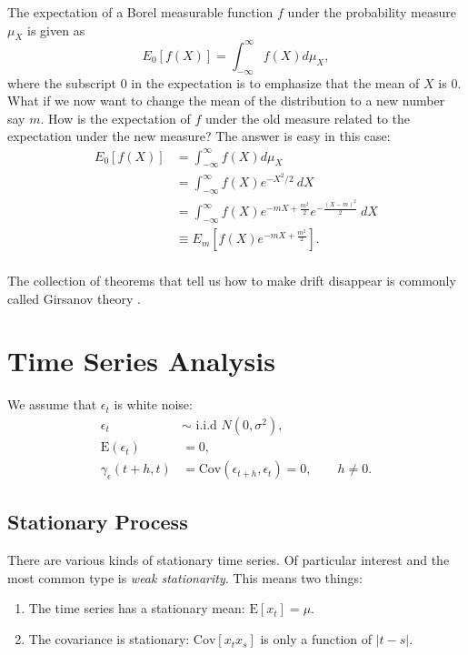 \documentclass{amsart}
\theoremstyle{plain}
\numberwithin{equation}{section}
\begin{document}
The expectation of a Borel measurable function 
$f$ under the probability measure 
$\mu_X$ is given as
\begin{equation*}
E_0[f(X)] = \int_{-\infty}^{\infty} f(X) d\mu_X,
\end{equation*}
where the subscript $0$ in the expectation is to 
emphasize that the mean of $X$ is $0$. What if
we now want to change the mean of the distribution
to a new number say $m$. How is the expectation of
$f$ under the old measure related to the 
expectation under the new measure?
The answer is easy in this case:
\begin{align*}
E_0[f(X)] &= \int_{-\infty}^{\infty} f(X) d\mu_X \\
					&= \int_{-\infty}^{\infty} f(X) e^{-X^2/2} \: dX \\
					&= \int_{-\infty}^{\infty} f(X) e^{-mX + \frac{m^2}{2}}e^{-\frac{(X-m)^2}{2}} \: dX \\
					&\equiv E_m\left[f(X)e^{-mX + \frac{m^2}{2}}\right].\\
\end{align*}


The collection of theorems that tell us how to make 
drift disappear is commonly called Girsanov theory
\cite[Ch.\ 13]{steele2001stochastic}.

\section{Time Series Analysis}
We assume that $\epsilon_t$ is white noise:
\begin{align*}
\epsilon_t &\sim \textrm{ i.i.d } N(0, \sigma^2),\\
\mathrm{E}(\epsilon_t) &= 0,\\
\gamma_\epsilon(t+h, t) &= \mathrm{Cov}(\epsilon_{t+h}, \epsilon_t) = 0, \qquad h \neq 0.
\end{align*}

\subsection*{Stationary Process}
There are various kinds of stationary time series. Of 
particular interest and the most common type is \emph{weak stationarity}. 
This means two things:
\begin{enumerate}
\item The time series has a stationary mean: $\mathrm{E}[x_t] = \mu$.
\item The covariance is stationary: $\mathrm{Cov}[x_t x_s ]$ is only a function 
of $|t-s|$.
\end{enumerate}
\end{document}
